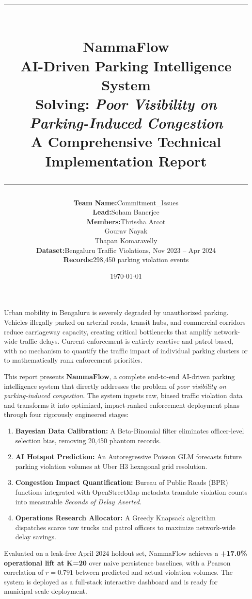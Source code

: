 \documentclass[12pt,a4paper]{article}
\title{
    \vspace{-1cm}
    \begin{center}
    {\color{accent}\rule{\textwidth}{2pt}}\\[0.4cm]
    {\LARGE\bfseries\color{primary} NammaFlow}\\[0.2cm]
    {\large\bfseries\color{accent} AI-Driven Parking Intelligence System}\\[0.3cm]
    {\large\color{textgray} Solving: \textit{Poor Visibility on Parking-Induced Congestion}}\\[0.2cm]
    {\normalsize\color{textgray} A Comprehensive Technical Implementation Report}\\[0.2cm]
    {\color{accent}\rule{\textwidth}{1pt}}
    \end{center}
    \vspace{-0.5cm}
}
\author{
    \begin{tabular}{rl}
        \textbf{Team Name:} & Commitment\_Issues \\[0.3em]
        \textbf{Lead:} & Soham Banerjee \\[0.2em]
        \textbf{Members:} & Thrissha Arcot \\
                         & Gourav Nayak \\
                         & Thapan Komaravelly \\[0.3em]
        \textbf{Dataset:} & Bengaluru Traffic Violations, Nov 2023 – Apr 2024 \\
        \textbf{Records:} & 298,450 parking violation events
    \end{tabular}
}
\date{\today}
\begin{document}
\maketitle
\thispagestyle{empty}
\vspace{0.5cm}

\newpage

\begin{tcolorbox}[problembox, title={Abstract}]
\setlength{\parindent}{0pt}
\setlength{\parskip}{6pt}
Urban mobility in Bengaluru is severely degraded by unauthorized parking. Vehicles illegally parked on arterial roads, transit hubs, and commercial corridors reduce carriageway capacity, creating critical bottlenecks that amplify network-wide traffic delays. Current enforcement is entirely reactive and patrol-based, with no mechanism to quantify the traffic impact of individual parking clusters or to mathematically rank enforcement priorities.

This report presents \textbf{NammaFlow}, a complete end-to-end AI-driven parking intelligence system that directly addresses the problem of \textit{poor visibility on parking-induced congestion}. The system ingests raw, biased traffic violation data and transforms it into optimized, impact-ranked enforcement deployment plans through four rigorously engineered stages:

\begin{enumerate}[leftmargin=2em, itemsep=2pt]
    \item \textbf{Bayesian Data Calibration:} A Beta-Binomial filter eliminates officer-level selection bias, removing 20,450 phantom records.
    \item \textbf{AI Hotspot Prediction:} An Autoregressive Poisson GLM forecasts future parking violation volumes at Uber H3 hexagonal grid resolution.
    \item \textbf{Congestion Impact Quantification:} Bureau of Public Roads (BPR) functions integrated with OpenStreetMap metadata translate violation counts into measurable \emph{Seconds of Delay Averted}.
    \item \textbf{Operations Research Allocator:} A Greedy Knapsack algorithm dispatches scarce tow trucks and patrol officers to maximize network-wide delay savings.
\end{enumerate}

Evaluated on a leak-free April 2024 holdout set, NammaFlow achieves a \textbf{+17.0\% operational lift at K=20} over naive persistence baselines, with a Pearson correlation of $r = 0.791$ between predicted and actual violation volumes. The system is deployed as a full-stack interactive dashboard and is ready for municipal-scale deployment.
\end{tcolorbox}
\end{document}
